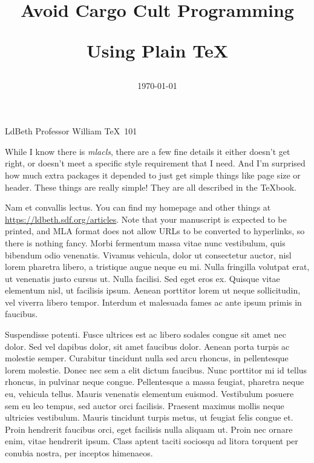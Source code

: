 

\mla
{} LdBeth
\teacher Professor William
\course \TeX\ 101
\date \today
\title{Avoid Cargo Cult Programming\par Using Plain \TeX}

While I know there is {\it mlacls}, there are a few fine details it
either doesn't get right, or doesn't meet a specific style requirement
that I need. And I'm surprised how much extra packages it depended to
just get simple things like page size or header. These things are
really simple! They are all described in the \TeX book.

Nam et convallis lectus. You can find my homepage
and other things at \url{https://ldbeth.sdf.org/articles}.
Note that your manuscript is expected to be printed, and MLA format
does not allow URLs to be converted to hyperlinks, so there
is nothing fancy. Morbi fermentum massa vitae nunc vestibulum,
quis bibendum odio venenatis. Vivamus vehicula, dolor ut consectetur
auctor, nisl lorem pharetra libero, a tristique augue neque eu
mi. Nulla fringilla volutpat erat, ut venenatis justo cursus ut. Nulla
facilisi. Sed eget eros ex. Quisque vitae elementum nisl, ut facilisis
ipsum. Aenean porttitor lorem ut neque sollicitudin, vel viverra
libero tempor. Interdum et malesuada fames ac ante ipsum primis in
faucibus.

Suspendisse potenti. Fusce ultrices est ac libero sodales congue sit
amet nec dolor. Sed vel dapibus dolor, sit amet faucibus dolor. Aenean
porta turpis ac molestie semper. Curabitur tincidunt nulla sed arcu
rhoncus, in pellentesque lorem molestie. Donec nec sem a elit dictum
faucibus. Nunc porttitor mi id tellus rhoncus, in pulvinar neque
congue. Pellentesque a massa feugiat, pharetra neque eu, vehicula
tellus. Mauris venenatis elementum euismod. Vestibulum posuere sem eu
leo tempus, sed auctor orci facilisis. Praesent maximus mollis neque
ultricies vestibulum. Mauris tincidunt turpis metus, ut feugiat felis
congue et. Proin hendrerit faucibus orci, eget facilisis nulla aliquam
ut. Proin nec ornare enim, vitae hendrerit ipsum. Class aptent taciti
sociosqu ad litora torquent per conubia nostra, per inceptos
himenaeos.


